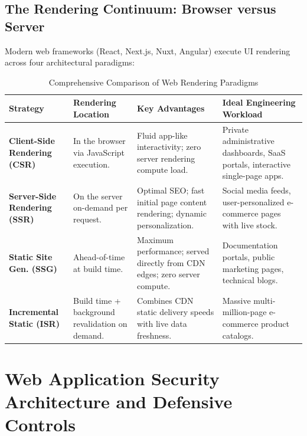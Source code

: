 \subsection{The Rendering Continuum: Browser versus Server}
Modern web frameworks (React, Next.js, Nuxt, Angular) execute UI rendering across four architectural paradigms:
\begin{table}[htbp]
\centering
\small
\caption{Comprehensive Comparison of Web Rendering Paradigms}
\label{tab:rendering_paradigms}
\begin{tabularx}{\textwidth}{l p{3.2cm} p{3.5cm} X}
\toprule
\textbf{Strategy} & \textbf{Rendering Location} & \textbf{Key Advantages} & \textbf{Ideal Engineering Workload} \\
\midrule
\textbf{Client-Side Rendering (CSR)} & In the browser via JavaScript execution. & Fluid app-like interactivity; zero server rendering compute load. & Private administrative dashboards, SaaS portals, interactive single-page apps. \\
\textbf{Server-Side Rendering (SSR)} & On the server on-demand per request. & Optimal SEO; fast initial page content rendering; dynamic personalization. & Social media feeds, user-personalized e-commerce pages with live stock. \\
\textbf{Static Site Gen. (SSG)} & Ahead-of-time at build time. & Maximum performance; served directly from CDN edges; zero server compute. & Documentation portals, public marketing pages, technical blogs. \\
\textbf{Incremental Static (ISR)} & Build time + background revalidation on demand. & Combines CDN static delivery speeds with live data freshness. & Massive multi-million-page e-commerce product catalogs. \\
\bottomrule
\end{tabularx}
\end{table}

\section{Web Application Security Architecture and Defensive Controls}
\label{sec:se_web_security}

